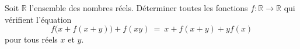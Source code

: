 Soit $\mathbb{R}$ l'ensemble des nombres réels. Déterminer toutes les fonctions
$f : \mathbb{R} \to \mathbb{R}$ qui vérifient l'équation
\[
f\bigl(x + f(x + y)\bigr) + f(xy) \ = \ x + f(x + y) + yf(x)
\]
pour tous réels $x$ et $y$.
